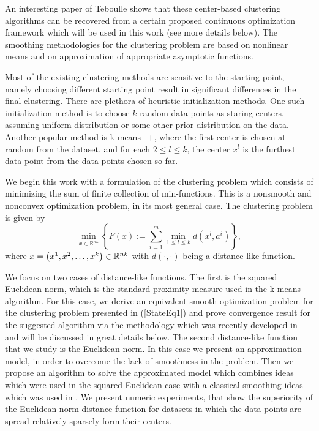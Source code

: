 An interesting paper of Teboulle \cite{T2007} shows that these center-based clustering algorithms can be recovered from a certain proposed continuous optimization framework which will be used in this work (see more details below). The smoothing methodologies for the clustering problem are based on nonlinear means and on approximation of appropriate asymptotic functions. \medskip

Most of the existing clustering methods are sensitive to the starting point, namely choosing different starting point result in significant differences in the final clustering. There are plethora of heuristic initialization methods. One such initialization method is to choose $k$ random data points as staring centers, assuming uniform distribution or some other prior distribution on the data. Another popular method is k-means++, where the first center is chosen at random from the dataset, and for each $2 \leq l \leq k$, the center $x^l$ is the furthest data point from the data points chosen so far. \medskip

We begin this work with a formulation of the clustering problem which consists of minimizing the sum of finite collection of min-functions. This is a nonsmooth and nonconvex optimization problem, in its most general case. The clustering problem is given by
\begin{equation}
	\min\limits_{x \in \mathbb{R}^{nk}} \left\lbrace F(x) := \sum\limits_{i=1}^{m} \min\limits_{1 \le l \le k} d(x^l,a^i) \right\rbrace , \label{StateEq1}
\end{equation}
where $x=\left( x^1,x^2, \ldots, x^k \right) \in \mathbb{R}^{nk}$ with $\textit{d}(\cdot ,\cdot)$ being a distance-like function. \medskip

We focus on two cases of distance-like functions. The first is the squared Euclidean norm, which is the standard proximity measure used in the k-means algorithm. For this case, we derive an equivalent smooth optimization problem for the clustering problem presented in (\ref{StateEq1}) and prove convergence result for the suggested algorithm via the methodology which was recently developed in \cite{BST2014} and will be discussed in great details below. The second distance-like function that we study is the Euclidean norm. In this case we present an approximation model, in order to overcome the lack of smoothness in the problem. Then we propose an algorithm to solve the approximated model which combines ideas which were used in the squared Euclidean case with a classical smoothing ideas which was used in \cite{BS2015}. We present numeric experiments, that show the superiority of the Euclidean norm distance function for datasets in which the data points are spread relatively sparsely form their centers. \medskip

